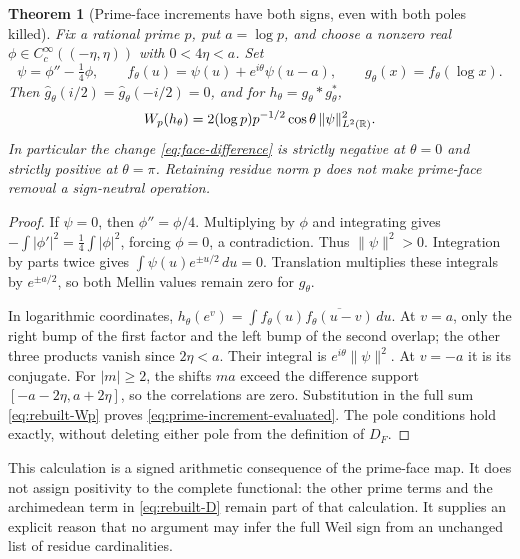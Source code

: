 \documentclass[11pt,a4paper]{article}
\newtheorem{theorem}{Theorem}[section]
\theoremstyle{definition}\newtheorem{definition}[theorem]{Definition}
\begin{document}
\begin{theorem}[Prime-face increments have both signs, even with both poles killed]\label{thm:prime-face-signs}
Fix a rational prime $p$, put $a=\log p$, and choose a nonzero real $\phi\in C_c^\infty((-\eta,\eta))$ with $0<4\eta<a$. Set
\[
 \psi=\phi''-\tfrac14\phi,\qquad
 f_\theta(u)=\psi(u)+e^{i\theta}\psi(u-a),\qquad
 g_\theta(x)=f_\theta(\log x).
\]
Then $\widehat g_\theta(i/2)=\widehat g_\theta(-i/2)=0$, and for $h_\theta=g_\theta*g_\theta^*$,
\begin{equation}\label{eq:prime-increment-evaluated}
 W_p(h_\theta)=2(\log p)p^{-1/2}\cos\theta\,\|\psi\|_{L^2(\mathbb R)}^2.
\end{equation}
In particular the change \eqref{eq:face-difference} is strictly negative at $\theta=0$ and strictly positive at $\theta=\pi$. Retaining residue norm $p$ does not make prime-face removal a sign-neutral operation.
\end{theorem}
\begin{proof}
If $\psi=0$, then $\phi''=\phi/4$. Multiplying by $\phi$ and integrating gives $-\int|\phi'|^2=\frac14\int|\phi|^2$, forcing $\phi=0$, a contradiction. Thus $\|\psi\|^2>0$.
Integration by parts twice gives
$\int\psi(u)e^{\pm u/2}\,du=0$. Translation multiplies these integrals by $e^{\pm a/2}$, so both Mellin values remain zero for $g_\theta$.

In logarithmic coordinates, $h_\theta(e^v)=\int f_\theta(u)\overline{f_\theta(u-v)}\,du$. At $v=a$, only the right bump of the first factor and the left bump of the second overlap; the other three products vanish since $2\eta<a$. Their integral is $e^{i\theta}\|\psi\|^2$. At $v=-a$ it is its conjugate. For $|m|\ge2$, the shifts $ma$ exceed the difference support $[-a-2\eta,a+2\eta]$, so the correlations are zero. Substitution in the full sum \eqref{eq:rebuilt-Wp} proves \eqref{eq:prime-increment-evaluated}. The pole conditions hold exactly, without deleting either pole from the definition of $D_F$.
\end{proof}

This calculation is a signed arithmetic consequence of the prime-face map. It does not assign positivity to the complete functional: the other prime terms and the archimedean term in \eqref{eq:rebuilt-D} remain part of that calculation. It supplies an explicit reason that no argument may infer the full Weil sign from an unchanged list of residue cardinalities.

\end{document}
